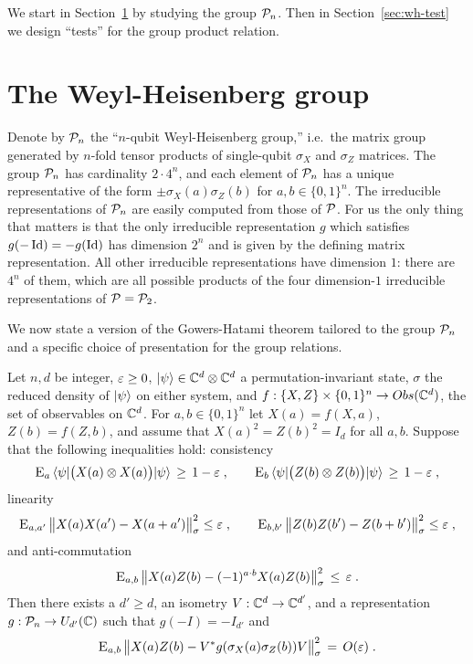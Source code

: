 We start in Section~\ref{sec:wh} by studying the group $\mathcal{P}_n$. Then in Section~\ref{sec:wh-test} we design ``tests'' for the group product relation. 






\section{The Weyl-Heisenberg group}
\label{sec:wh}

Denote by $\mathcal{P}_n$ the ``$n$-qubit Weyl-Heisenberg group,'' i.e.\ the matrix group generated by $n$-fold tensor products of single-qubit $\sigma_X$ and $\sigma_Z$ matrices. The group $\mathcal{P}_n$ has cardinality $2\cdot 4^n$, and each element of $\mathcal{P}_n$ has a unique representative of the form $\pm \sigma_X(a)\sigma_Z(b)$ for $a,b\in\{0,1\}^n$. 
 The irreducible representations of  $\mathcal{P}_n$ are easily computed from those of $\mathcal{P}$.  For us the only thing that matters is that the only irreducible representation $g$ which satisfies $g(-\mathop{\rm Id}\nolimits)=-g(\mathop{\rm Id}\nolimits)$ has dimension $2^n$ and is given by the defining matrix representation. All other irreducible representations have dimension $1$: there are $4^n$ of them, which are all possible products of the four dimension-$1$ irreducible representations of $\mathcal{P}=\mathcal{P}_2$.

We now state a version of the Gowers-Hatami theorem tailored to the group $\mathcal{P}_n$ and a specific choice of presentation for the group relations. 

\begin{corollary}\label{cor:gh}
Let $n,d$ be integer, $\varepsilon \geq 0$, $|\psi\rangle \in \mathbb{C}^d \otimes \mathbb{C}^d$ a permutation-invariant state, $\sigma$ the reduced density of $|\psi\rangle$ on either system,  and $f: \{X,Z\}\times \{0,1\}^n \to Obs(\mathbb{C}^d)$, the set of observables on $\mathbb{C}^d$. For $a,b\in\{0,1\}^n$ let $X(a)=f(X,a)$, $Z(b)=f(Z,b)$, and assume that $X(a)^2=Z(b)^2=I_d$ for all $a,b$. Suppose that the following inequalities hold: consistency
\begin{equation}\label{eq:gh-cons}
 \textsc{E}_{a} \, \langle\psi| \big(X(a) \otimes X(a)\big) |\psi\rangle \,\geq\,1-\varepsilon\;,\qquad \textsc{E}_{b} \,\langle\psi| \big(Z(b) \otimes Z(b) \big)|\psi\rangle\,\geq\,1-\varepsilon\;,
\end{equation}
linearity
\begin{equation}\label{eq:gh-commute}
 \textsc{E}_{a,a'} \,\big\|X(a)X(a')-X(a+a')\big\|_\sigma^2 \leq \varepsilon\;,\qquad\textsc{E}_{b,b'}\, \big\|Z(b)Z(b')-Z(b+b')\big\|_\sigma^2 \leq \varepsilon\;,
\end{equation}
and anti-commutation
\begin{equation}\label{eq:gh-ac}
 \textsc{E}_{a,b} \,\big\| X(a)Z(b)-(-1)^{a\cdot b} X(a)Z(b)\big\|_\sigma^2\,\leq\,\varepsilon\;.
\end{equation}
Then there exists a $d'\geq d$, an isometry $V:\mathbb{C}^d\to \mathbb{C}^{d'}$, and a representation $g:\mathcal{P}_n\to U_{d'}(\mathbb{C})$ such that $g(-I)=-I_{d'}$ and
$$\textsc{E}_{a,b}\, \big\| X(a)Z(b) - V^*g(\sigma_X(a)\sigma_Z(b))V \big\|_\sigma^2 \,=\, O(\varepsilon)\;.$$
\end{corollary}

